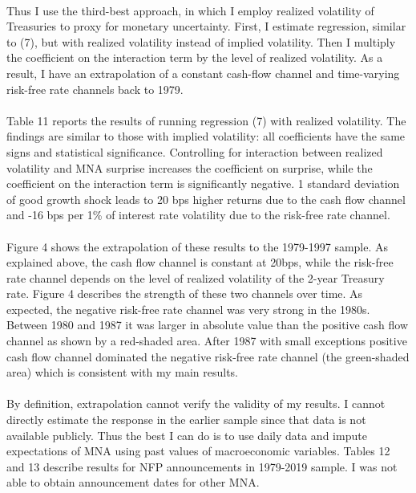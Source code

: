 \documentclass[12pt]{article}
\begin{document}
\paragraph{}
Thus I use the third-best approach, in which I employ realized volatility of Treasuries to proxy for monetary uncertainty. First, I estimate regression, similar to (7), but with realized volatility instead of implied volatility. Then I multiply the coefficient on the interaction term by the level of realized volatility. As a result, I have an extrapolation of a constant cash-flow channel and time-varying risk-free rate channels back to 1979.
\paragraph{}
Table 11 reports the results of running regression (7) with realized volatility. The findings are similar to those with implied volatility: all coefficients have the same signs and statistical significance. Controlling for interaction between realized volatility and MNA surprise increases the coefficient on surprise, while the coefficient on the interaction term is significantly negative. 1 standard deviation of good growth shock leads to 20 bps higher returns due to the cash flow channel and -16 bps per 1\% of interest rate volatility due to the risk-free rate channel. 
\paragraph{}
Figure 4 shows the extrapolation of these results to the 1979-1997 sample. As explained above, the cash flow channel is constant at 20bps, while the risk-free rate channel depends on the level of realized volatility of the 2-year Treasury rate. Figure 4 describes the strength of these two channels over time. As expected, the negative risk-free rate channel was very strong in the 1980s. Between 1980 and 1987 it was larger in absolute value than the positive cash flow channel as shown by a red-shaded area. After 1987 with small exceptions positive cash flow channel dominated the negative risk-free rate channel (the green-shaded area) which is consistent with my main results.
\paragraph{}
By definition, extrapolation cannot verify the validity of my results. I cannot directly estimate the response in the earlier sample since that data is not available publicly. Thus the best I can do is to use daily data and impute expectations of MNA using past values of macroeconomic variables. Tables 12 and 13 describe results for NFP announcements in 1979-2019 sample. I was not able to obtain announcement dates for other MNA. 
\end{document}
